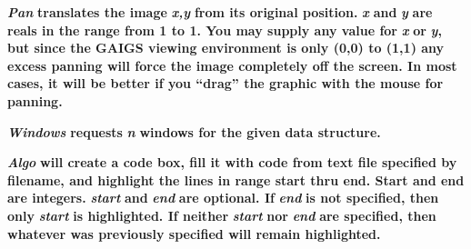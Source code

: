 \documentclass[12pt]{article}
\begin{document}
\setlength{\oddsidemargin}{1.0000in-1in}
\setlength{\textwidth}{\paperwidth - 1.0000in-1.0000in}

\begin{flushleft}
\textbf{\textit{{\footnotesize{}Pan}}}\textbf{{\footnotesize{} translates the image }}\textbf{\textit{{\footnotesize{}x,y}}}\textbf{{\footnotesize{} from its original position. }}\textbf{\textit{{\footnotesize{} x}}}\textbf{{\footnotesize{} and}}\textbf{\textit{{\footnotesize{} y }}}\textbf{{\footnotesize{}are reals in the range from 1 to 1.  You may supply any value for }}\textbf{\textit{{\footnotesize{}x}}}\textbf{{\footnotesize{} or}}\textbf{\textit{{\footnotesize{} y}}}\textbf{{\footnotesize{}, but since the GAIGS viewing environment is only (0,0) to (1,1) any excess panning will force the image completely off the screen.  In most cases, it will be better if you ``drag'' the graphic with the mouse for panning.  }}
\end{flushleft}

\begin{flushleft}

\end{flushleft}

\begin{flushleft}
\textbf{\textit{{\footnotesize{}Windows}}}\textbf{{\footnotesize{} requests }}\textbf{\textit{{\footnotesize{}n}}}\textbf{{\footnotesize{} windows for the given data structure. }}
\end{flushleft}

\begin{flushleft}

\end{flushleft}

\begin{flushleft}
\textbf{\textit{{\footnotesize{}Algo}}}\textbf{{\footnotesize{} will create a code box, fill it with code from text file specified by filename, and highlight the lines in range start thru end. Start and end are integers.  }}\textbf{\textit{{\footnotesize{}start}}}\textbf{{\footnotesize{} and }}\textbf{\textit{{\footnotesize{}end}}}\textbf{{\footnotesize{} are optional.  If }}\textbf{\textit{{\footnotesize{}end}}}\textbf{{\footnotesize{} is not specified, then only }}\textbf{\textit{{\footnotesize{}start}}}\textbf{{\footnotesize{} is highlighted.  If neither }}\textbf{\textit{{\footnotesize{}start}}}\textbf{{\footnotesize{} nor }}\textbf{\textit{{\footnotesize{}end}}}\textbf{{\footnotesize{} are specified, then whatever was previously specified will remain highlighted.  }}
\end{flushleft}
\end{document}
